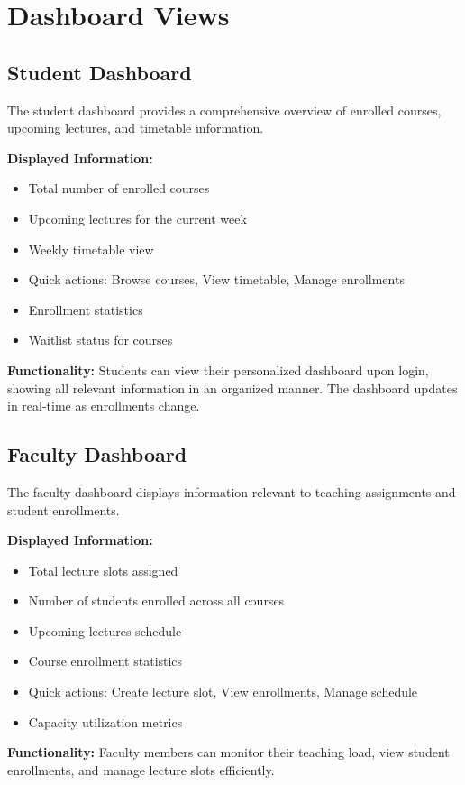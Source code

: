 \section{Dashboard Views}

\subsection{Student Dashboard}
The student dashboard provides a comprehensive overview of enrolled courses, upcoming lectures, and timetable information.

\textbf{Displayed Information:}
\begin{itemize}
    \item Total number of enrolled courses
    \item Upcoming lectures for the current week
    \item Weekly timetable view
    \item Quick actions: Browse courses, View timetable, Manage enrollments
    \item Enrollment statistics
    \item Waitlist status for courses
\end{itemize}

\textbf{Functionality:} Students can view their personalized dashboard upon login, showing all relevant information in an organized manner. The dashboard updates in real-time as enrollments change.

\subsection{Faculty Dashboard}
The faculty dashboard displays information relevant to teaching assignments and student enrollments.

\textbf{Displayed Information:}
\begin{itemize}
    \item Total lecture slots assigned
    \item Number of students enrolled across all courses
    \item Upcoming lectures schedule
    \item Course enrollment statistics
    \item Quick actions: Create lecture slot, View enrollments, Manage schedule
    \item Capacity utilization metrics
\end{itemize}

\textbf{Functionality:} Faculty members can monitor their teaching load, view student enrollments, and manage lecture slots efficiently.

